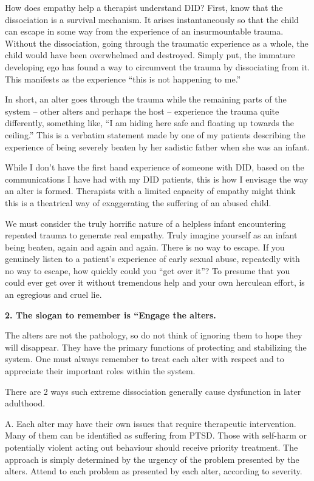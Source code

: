 \documentclass[]{book}
\begin{document}
How does empathy help a therapist understand DID? First, know that the dissociation is a survival mechanism. It arises instantaneously so that the child can escape in some way from the experience of an insurmountable trauma. Without the dissociation, going through the traumatic experience as a whole, the child would have been overwhelmed and destroyed. Simply put, the immature developing ego has found a way to circumvent the trauma by dissociating from it. This manifests as the experience ``this is not happening to me.''

In short, an alter goes through the trauma while the remaining parts of the system -- other alters and perhaps the host -- experience the trauma quite differently, something like, ``I am hiding here safe and floating up towards the ceiling.'' This is a verbatim statement made by one of my patients describing the experience of being severely beaten by her sadistic father when she was an infant.

While I don't have the first hand experience of someone with DID, based on the communications I have had with my DID patients, this is how I envisage the way an alter is formed. Therapists with a limited capacity of empathy might think this is a theatrical way of exaggerating the suffering of an abused child.

We must consider the truly horrific nature of a helpless infant encountering repeated trauma to generate real empathy. Truly imagine yourself as an infant being beaten, again and again and again. There is no way to escape. If you genuinely listen to a patient's experience of early sexual abuse, repeatedly with no way to escape, how quickly could you ``get over it''? To presume that you could ever get over it without tremendous help and your own herculean effort, is an egregious and cruel lie.

\textbf{2. The slogan to remember is ``Engage the alters.}

The alters are not the pathology, so do not think of ignoring them to hope they will disappear. They have the primary functions of protecting and stabilizing the system. One must always remember to treat each alter with respect and to appreciate their important roles within the system.

There are 2 ways such extreme dissociation generally cause dysfunction in later adulthood.

A. Each alter may have their own issues that require therapeutic intervention. Many of them can be identified as suffering from PTSD. Those with self-harm or potentially violent acting out behaviour should receive priority treatment. The approach is simply determined by the urgency of the problem presented by the alters. Attend to each problem as presented by each alter, according to severity.
\end{document}
